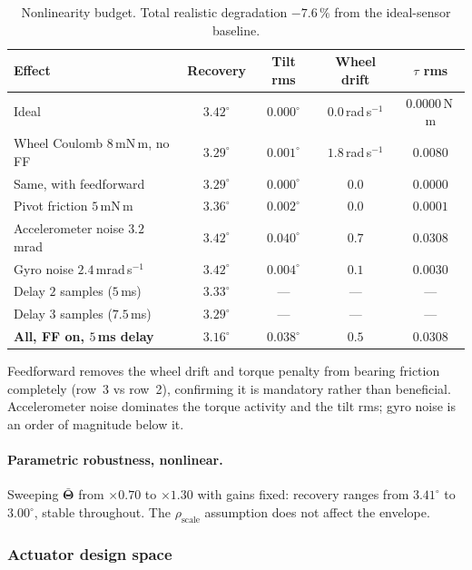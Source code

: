\begin{table}[!t]
\centering
\small
\begin{tabular}{@{}lcccc@{}}
\toprule
\textbf{Effect} & \textbf{Recovery} & \textbf{Tilt rms} & \textbf{Wheel drift}
& $\tau$ \textbf{rms}\\
\midrule
Ideal & $3.42^\circ$ & $0.000^\circ$ & $0.0$\,rad\,s$^{-1}$ & $0.0000$\,N\,m\\
Wheel Coulomb $8$\,mN\,m, no FF & $3.29^\circ$ & $0.001^\circ$ & $1.8$\,rad\,s$^{-1}$ & $0.0080$\\
Same, with feedforward & $3.29^\circ$ & $0.000^\circ$ & $0.0$ & $0.0000$\\
Pivot friction $5$\,mN\,m & $3.36^\circ$ & $0.002^\circ$ & $0.0$ & $0.0001$\\
Accelerometer noise $3.2$\,mrad & $3.42^\circ$ & $0.040^\circ$ & $0.7$ & $0.0308$\\
Gyro noise $2.4$\,mrad\,s$^{-1}$ & $3.42^\circ$ & $0.004^\circ$ & $0.1$ & $0.0030$\\
Delay $2$ samples ($5$\,ms) & $3.33^\circ$ & --- & --- & ---\\
Delay $3$ samples ($7.5$\,ms) & $3.29^\circ$ & --- & --- & ---\\
\textbf{All, FF on, $5$\,ms delay} & $\bm{3.16^\circ}$ & $0.038^\circ$ & $0.5$ & $0.0308$\\
\bottomrule
\end{tabular}
\caption{Nonlinearity budget. Total realistic degradation $-7.6\,\%$ from the
ideal-sensor baseline.}
\label{tab:nonlinearity-budget}
\end{table}

Feedforward removes the wheel drift and torque penalty from bearing friction
completely (row~3 vs row~2), confirming it is mandatory rather than
beneficial. Accelerometer noise dominates the torque activity and the tilt
rms; gyro noise is an order of magnitude below it.

\paragraph{Parametric robustness, nonlinear.} Sweeping $\bar{\bm{\Theta}}$
from $\times 0.70$ to $\times 1.30$ with gains fixed: recovery ranges from
$3.41^\circ$ to $3.00^\circ$, stable throughout. The $\rho_{\mathrm{scale}}$
assumption does not affect the envelope.

\FloatBarrier

\subsubsection{Actuator design space}
\label{sec:actuator-design}

